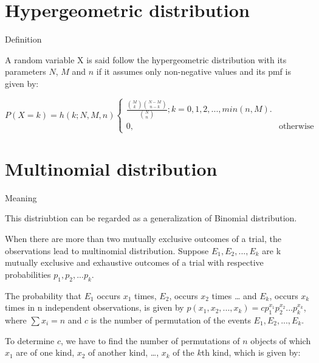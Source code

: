 \documentclass[ignorenonframetext,aspectratio=169]{beamer}
\begin{document}
\hypertarget{hypergeometric-distribution}{%
\section{Hypergeometric
distribution}\label{hypergeometric-distribution}}

\begin{frame}{Definition}
\protect\hypertarget{definition-3}{}

A random variable X is said follow the hypergeometric distribution with
its parameters \(N\), \(M\) and \(n\) if it assumes only non-negative
values and its pmf is given by:

\[
P(X = k) = h(k; N, M, n)
\begin{cases}
\frac{\binom{M}{k}\binom{N-M}{n-k}}{\binom{N}{n}}; k = 0, 1, 2, ..., min(n, M). \\
0, & \text{otherwise}
\end{cases}
\]

\end{frame}

\hypertarget{multinomial-distribution}{%
\section{Multinomial distribution}\label{multinomial-distribution}}

\begin{frame}{Meaning}
\protect\hypertarget{meaning}{}

This distriubtion can be regarded as a generalization of Binomial
distribution.

When there are more than two mutually exclusive outcomes of a trial, the
observations lead to multinomial distribution. Suppose
\(E_1, E_2, ..., E_k\) are k mutually exclusive and exhaustive outcomes
of a trial with respective probabilities \(p_1, p_2, ... p_k\).

The probability that \(E_1\) occurs \(x_1\) times, \(E_2\), occurs
\(x_2\) times \ldots{} and \(E_k\), occurs \(x_k\) times in n
independent observations, is given by
\(p(x_1, x_2, ..., x_k) = cp_1^{x_1} p_2^{x_2}...p_k^{x_k}\), where
\(\sum x_i = n\) and \(c\) is the number of permutation of the events
\(E_1, E_2,...,E_k\).

To determine \(c\), we have to find the number of permutations of \(n\)
objects of which \(x_1\) are of one kind, \(x_2\) of another kind,
\ldots{}, \(x_k\) of the \(k\)th kind, which is given by:

\end{frame}
\end{document}
